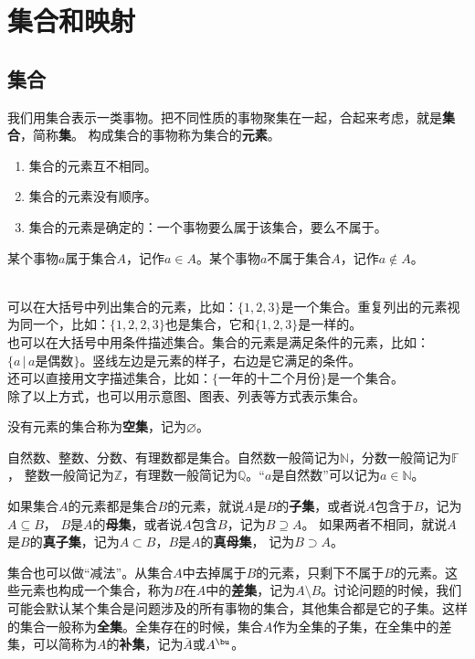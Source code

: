 \chapter{集合和映射}  %
\section{集合}
我们用集合表示一类事物。把不同性质的事物聚集在一起，合起来考虑，就是\textbf{集合}，简称\textbf{集}。
构成集合的事物称为集合的\textbf{元素}。
\begin{enumerate}
    \item 集合的元素互不相同。
    \item 集合的元素没有顺序。
    \item 集合的元素是确定的：一个事物要么属于该集合，要么不属于。
\end{enumerate}

某个事物$a$属于集合$A$，记作$a\in A$。某个事物$a$不属于集合$A$，记作$a\notin A$。

\begin{ex}\label{ex:2-0-0}
    \mbox{} \\ 
    \indent 可以在大括号中列出集合的元素，比如：$\{1,2,3\}$是一个集合。重复列出的元素视为同一个，比如：$\{1,2,2,3\}$也是集合，它和$\{1,2,3\}$是一样的。 \\
    \indent 也可以在大括号中用条件描述集合。集合的元素是满足条件的元素，比如：$\{ a\, |\, a\mbox{是偶数}\}$。竖线左边是元素的样子，右边是它满足的条件。\\
    \indent 还可以直接用文字描述集合，比如：$\{\mbox{一年的十二个月份}\}$是一个集合。\\
    \indent 除了以上方式，也可以用示意图、图表、列表等方式表示集合。
\end{ex}

没有元素的集合称为\textbf{空集}，记为$\varnothing$。

自然数、整数、分数、有理数都是集合。自然数一般简记为$\mathbb{N}$，分数一般简记为$\mathbb{F}$，
整数一般简记为$\mathbb{Z}$，有理数一般简记为$\mathbb{Q}$。“$a$是自然数”可以记为$a\in\mathbb{N}$。

如果集合$A$的元素都是集合$B$的元素，就说$A$是$B$的\textbf{子集}，或者说$A$包含于$B$，记为$A\subseteq B$，
$B$是$A$的\textbf{母集}，或者说$A$包含$B$，记为$B\supseteq A$。
如果两者不相同，就说$A$是$B$的\textbf{真子集}，记为$A\subset B$，$B$是$A$的\textbf{真母集}，
记为$B\supset A$。

集合也可以做“减法”。从集合$A$中去掉属于$B$的元素，只剩下不属于$B$的元素。这些元素也构成一个集合，称为$B$在$A$中的\textbf{差集}，记为$A\setminus B$。讨论问题的时候，我们可能会默认某个集合是问题涉及的所有事物的集合，其他集合都是它的子集。这样的集合一般称为\textbf{全集}。全集存在的时候，集合$A$作为全集的子集，在全集中的差集，可以简称为$A$的\textbf{补集}，记为$\bar{A}$或$A^{\bu}$。

